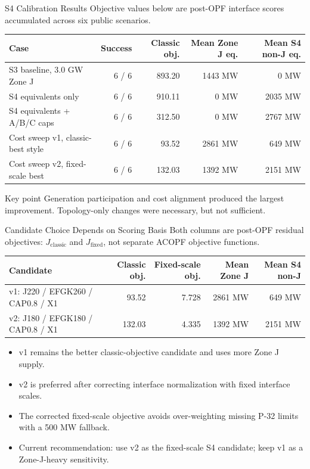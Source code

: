 \documentclass[aspectratio=169,10pt]{beamer}
\newcommand{\good}[1]{\textcolor{softgreen}{#1}}
\begin{document}
\begin{frame}{S4 Calibration Results}
\footnotesize
Objective values below are post-OPF interface scores accumulated across six public scenarios.

\vspace{0.4em}
\scriptsize
\begin{tabularx}{\linewidth}{X r r r r}
\toprule
\textbf{Case} & \textbf{Success} & \textbf{Classic obj.} & \textbf{Mean Zone J eq.} & \textbf{Mean S4 non-J eq.} \\
\midrule
S3 baseline, 3.0 GW Zone J & 6 / 6 & 893.20 & 1443 MW & 0 MW \\
S4 equivalents only & 6 / 6 & 910.11 & 0 MW & 2035 MW \\
S4 equivalents + A/B/C caps & 6 / 6 & 312.50 & 0 MW & 2767 MW \\
Cost sweep v1, classic-best style & 6 / 6 & 93.52 & 2861 MW & 649 MW \\
Cost sweep v2, fixed-scale best & 6 / 6 & 132.03 & 1392 MW & 2151 MW \\
\bottomrule
\end{tabularx}

\vspace{0.7em}
\begin{block}{Key point}
Generation participation and cost alignment produced the largest improvement. Topology-only changes were necessary, but not sufficient.
\end{block}
\end{frame}

\begin{frame}{Candidate Choice Depends on Scoring Basis}
\footnotesize
Both columns are post-OPF residual objectives: $J_{\mathrm{classic}}$ and $J_{\mathrm{fixed}}$, not separate ACOPF objective functions.

\vspace{0.35em}
\scriptsize
\begin{tabularx}{\linewidth}{X r r r r}
\toprule
\textbf{Candidate} & \textbf{Classic obj.} & \textbf{Fixed-scale obj.} & \textbf{Mean Zone J} & \textbf{Mean S4 non-J} \\
\midrule
v1: J220 / EFGK260 / CAP0.8 / X1 & \good{93.52} & 7.728 & 2861 MW & 649 MW \\
v2: J180 / EFGK180 / CAP0.8 / X1 & 132.03 & \good{4.335} & 1392 MW & 2151 MW \\
\bottomrule
\end{tabularx}

\vspace{0.7em}
\begin{itemize}
  \item v1 remains the better classic-objective candidate and uses more Zone J supply.
  \item v2 is preferred after correcting interface normalization with fixed interface scales.
  \item The corrected fixed-scale objective avoids over-weighting missing P-32 limits with a 500 MW fallback.
  \item Current recommendation: use v2 as the fixed-scale S4 candidate; keep v1 as a Zone-J-heavy sensitivity.
\end{itemize}
\end{frame}
\end{document}
